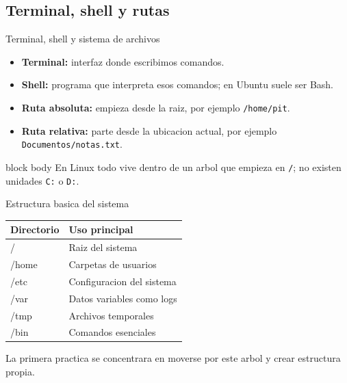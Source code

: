 \documentclass[aspectratio=169]{beamer}
\begin{document}
\subsection{Terminal, shell y rutas}
\begin{frame}{Terminal, shell y sistema de archivos}
  \begin{itemize}
    \item \textbf{Terminal:} interfaz donde escribimos comandos.
    \item \textbf{Shell:} programa que interpreta esos comandos; en Ubuntu suele ser Bash.
    \item \textbf{Ruta absoluta:} empieza desde la raiz, por ejemplo \texttt{/home/pit}.
    \item \textbf{Ruta relativa:} parte desde la ubicacion actual, por ejemplo \texttt{Documentos/notas.txt}.
  \end{itemize}
  \vfill
  \begin{beamercolorbox}[rounded=true, shadow=false, sep=4pt, center]{block body}
    \small En Linux todo vive dentro de un arbol que empieza en \texttt{/}; no existen unidades \texttt{C:} o \texttt{D:}.
  \end{beamercolorbox}
\end{frame}

\begin{frame}{Estructura basica del sistema}
  \begin{center}
  \footnotesize
  \begin{tabular}{>{\ttfamily}l p{}}
    \toprule
    \normalfont Directorio & Uso principal \\
    \midrule
    /        & Raiz del sistema \\
    /home    & Carpetas de usuarios \\
    /etc     & Configuracion del sistema \\
    /var     & Datos variables como logs \\
    /tmp     & Archivos temporales \\
    /bin     & Comandos esenciales \\
    \bottomrule
  \end{tabular}
  \end{center}
  \vspace{0.35cm}
  \centering
  \small La primera practica se concentrara en moverse por este arbol y crear estructura propia.
\end{frame}
\end{document}

